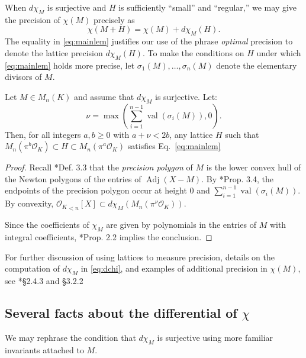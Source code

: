 \documentclass{sig-alternate-05-2015}
\DeclareMathOperator{\val}{val}
\DeclareMathOperator{\adj}{Adj}
\newcommand{\OK}{\mathcal{O}_K}
\begin{document}
When $d\chi_M$ is surjective and $H$ is sufficiently ``small'' and ``regular,'' we may give
the precision of $\chi(M)$ precisely as
\begin{equation} \label{eq:mainlem}
\chi(M + H) = \chi(M) + d\chi_M(H).
\end{equation}
The equality in \eqref{eq:mainlem} justifies our use of the phrase \emph{optimal} precision
to denote the lattice precision $d\chi_M(H)$. To make the conditions on $H$ under
which \eqref{eq:mainlem} holds more precise, let
$\sigma_1(M), \dots, \sigma_n(M)$ denote the elementary divisors of $M$.

\begin{prop} \label{prop:mainlem}
Let $M \in M_n(K)$ and assume that $d \chi_M$ is surjective. Let:
\[
\nu = \max\left(\sum_{i=1}^{n-1} \val(\sigma_i(M)), 0\right).
\]
Then, for all integers $a, b \geq 0$ with $a + \nu < 2b$,
any lattice $H$ such that $M_n(\pi^b \OK) \subset H \subset
M_n(\pi^a \OK)$
satisfies Eq.~\eqref{eq:mainlem}
\end{prop}

\begin{proof}
Recall \cite{caruso-roe-vaccon:15a}*{Def. 3.3} that the \emph{precision polygon}
of $M$ is the lower convex hull of the Newton polygons of the entries of $\adj(X-M)$.
By \cite{caruso-roe-vaccon:15a}*{Prop. 3.4}, the endpoints of the precision polygon
occur at height $0$ and $\sum_{i=1}^{n-1} \val(\sigma_i(M))$.  By convexity,
${\OK}_{<n}[X] \subset d\chi_M(M_n(\pi^\nu \OK))$.

Since the coefficients of $\chi_M$ are given by polynomials in the entries of $M$
with integral coefficients, \cite{caruso-roe-vaccon:15a}*{Prop. 2.2} implies
the conclusion.
\end{proof}

For further discussion of using lattices to measure precision,
details on the computation of $d\chi_M$ in \eqref{eq:dchi}, and 
examples of additional precision in $\chi(M)$,
see \cite{caruso:17a}*{\S 2.4.3 and \S 3.2.2}

\subsection{Several facts about the differential of $\chi$}

We may rephrase the condition that $d\chi_M$ is surjective using more familiar invariants attached to $M$.
\end{document}
